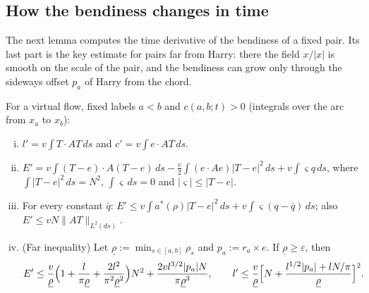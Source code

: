 \subsection{How the bendiness changes in time}

The next lemma computes the time derivative of the bendiness of a fixed pair. Its last part is the key estimate for
pairs far from Harry: there the field $x/|x|$ is smooth on the scale of the pair, and the bendiness can grow only
through the sideways offset $p_a$ of Harry from the chord.

\begin{lemma}\label{lem:Eprime}
For a virtual flow, fixed labels $a<b$ and $c(a,b;t)>0$ \textup(integrals over the arc from $x_a$ to $x_b$\textup):
\begin{enumerate}[(i)]
\setlength{\itemsep}{1pt}\setlength{\parskip}{0pt}
\item $l'=v\int T\cdot AT\,ds$ and $c'=v\int e\cdot AT\,ds$.
\item $E'=v\int(T-e)\cdot A(T-e)\,ds-\frac v2\int(e\cdot Ae)|T-e|^2\,ds+v\int\varsigma q\,ds$, where
$\int|T-e|^2\,ds=N^2$, $\int\varsigma\,ds=0$ and $|\varsigma|\le|T-e|$.
\item For every constant $\bar q$: $E'\le v\int a^*(\rho)|T-e|^2\,ds+v\int\varsigma(q-\bar q)\,ds$; also
$E'\le vN\|AT\|_{L^2(ds)}$.
\item \textup(Far inequality\textup) Let $\underline\rho:=\min_{s\in[a,b]}\rho_s$ and $p_a:=r_a\times e$. If
$\underline\rho\ge\varepsilon$, then
\[
E'\le\frac v{\underline\rho}\Bigl(1+\frac l{\pi\underline\rho}+\frac{2l^2}{\pi^2\underline\rho^2}\Bigr)N^2
+\frac{2vl^{3/2}|p_a|N}{\pi\underline\rho^3},\qquad
l'\le\frac v{\underline\rho}\Bigl[N+\frac{l^{1/2}|p_a|+lN/\pi}{\underline\rho}\Bigr]^2 .
\]
\end{enumerate}
\end{lemma}

